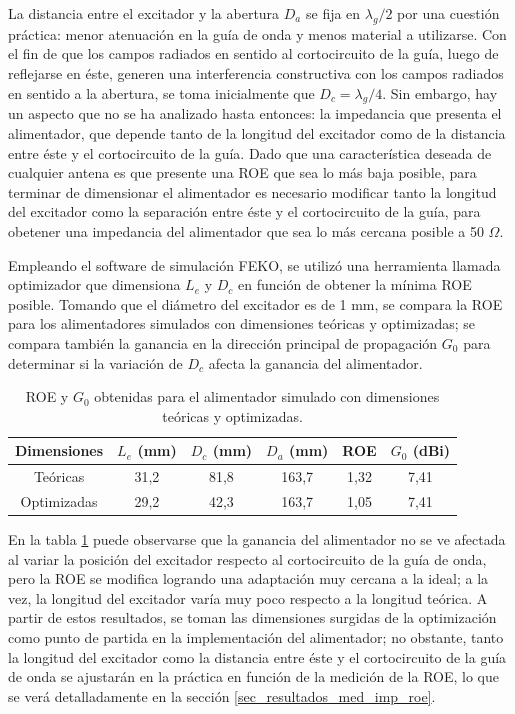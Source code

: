 La distancia entre el excitador y la abertura $D_a$ se fija en $\lambda_g/2$ por una cuestión práctica: menor atenuación en la guía de onda y menos material a utilizarse. Con el fin de que los campos radiados en sentido al cortocircuito de la guía, luego de reflejarse en éste, generen una interferencia constructiva con los campos radiados en sentido a la abertura, se toma inicialmente que $D_c = \lambda_g/4$. Sin embargo, hay un aspecto que no se ha analizado hasta entonces: la impedancia que presenta el alimentador, que depende tanto de la longitud del excitador como de la distancia entre éste y el cortocircuito de la guía. Dado que una característica deseada de cualquier antena es que presente una ROE que sea lo más baja posible, para terminar de dimensionar el alimentador es necesario modificar tanto la longitud del excitador como la separación entre éste y el cortocircuito de la guía, para obetener una impedancia del alimentador que sea lo más cercana posible a 50 $\Omega$.

Empleando el software de simulación FEKO, se utilizó una herramienta llamada optimizador que dimensiona $L_e$ y $D_c$ en función de obtener la mínima ROE posible. Tomando que el diámetro del excitador es de 1 mm, se compara la ROE para los alimentadores simulados con dimensiones teóricas y optimizadas; se compara también la ganancia en la dirección principal de propagación $G_0$ para determinar si la variación de $D_c$ afecta la ganancia del alimentador.
\begin{table}[H]
\centering
\begin{tabular}{|c|c|c|c|c|c|}
\hline
Dimensiones & $L_e$ (mm) & $D_c$ (mm) & $D_a$ (mm) & ROE & $G_0$ (dBi)\\
\hline
Teóricas & 31,2 & 81,8 & 163,7 & 1,32 & 7,41\\
\hline
Optimizadas & 29,2 & 42,3 & 163,7 & 1,05 & 7,41\\
\hline
\end{tabular}
\caption{ROE y $G_0$ obtenidas para el alimentador simulado con dimensiones teóricas y optimizadas.}
\label{tabla_estudio:17}
\end{table}
En la tabla \ref{tabla_estudio:17} puede observarse que la ganancia del alimentador no se ve afectada al variar la posición del excitador respecto al cortocircuito de la guía de onda, pero la ROE se modifica logrando una adaptación muy cercana a la ideal; a la vez, la longitud del excitador varía muy poco respecto a la longitud teórica. A partir de estos resultados, se toman las dimensiones surgidas de la optimización como punto de partida en la implementación del alimentador; no obstante, tanto la longitud del excitador como la distancia entre éste y el cortocircuito de la guía de onda se ajustarán en la práctica en función de la medición de la ROE, lo que se verá detalladamente en la sección \ref{sec_resultados_med_imp_roe}.